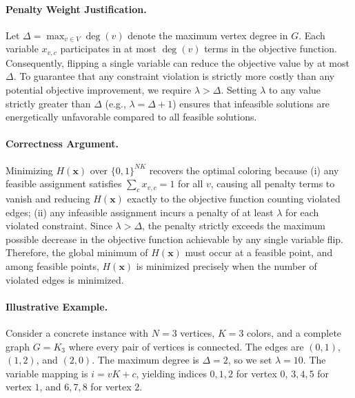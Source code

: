 \documentclass[12pt]{article}
\begin{document}
\paragraph{Penalty Weight Justification.}
Let $\Delta = \max_{v \in V} \deg(v)$ denote the maximum vertex degree in $G$. Each variable $x_{v,c}$ participates in at most $\deg(v)$ terms in the objective function. Consequently, flipping a single variable can reduce the objective value by at most $\Delta$. To guarantee that any constraint violation is strictly more costly than any potential objective improvement, we require $\lambda > \Delta$. Setting $\lambda$ to any value strictly greater than $\Delta$ (e.g., $\lambda = \Delta + 1$) ensures that infeasible solutions are energetically unfavorable compared to all feasible solutions.

\paragraph{Correctness Argument.}
Minimizing $H(\mathbf{x})$ over $\{0,1\}^{NK}$ recovers the optimal coloring because (i) any feasible assignment satisfies $\sum_{c} x_{v,c} = 1$ for all $v$, causing all penalty terms to vanish and reducing $H(\mathbf{x})$ exactly to the objective function counting violated edges; (ii) any infeasible assignment incurs a penalty of at least $\lambda$ for each violated constraint. Since $\lambda > \Delta$, the penalty strictly exceeds the maximum possible decrease in the objective function achievable by any single variable flip. Therefore, the global minimum of $H(\mathbf{x})$ must occur at a feasible point, and among feasible points, $H(\mathbf{x})$ is minimized precisely when the number of violated edges is minimized.

\paragraph{Illustrative Example.}
Consider a concrete instance with $N=3$ vertices, $K=3$ colors, and a complete graph $G=K_3$ where every pair of vertices is connected. The edges are $(0,1)$, $(1,2)$, and $(2,0)$. The maximum degree is $\Delta=2$, so we set $\lambda=10$. The variable mapping is $i = vK + c$, yielding indices $0,1,2$ for vertex $0$, $3,4,5$ for vertex $1$, and $6,7,8$ for vertex $2$.
\end{document}
